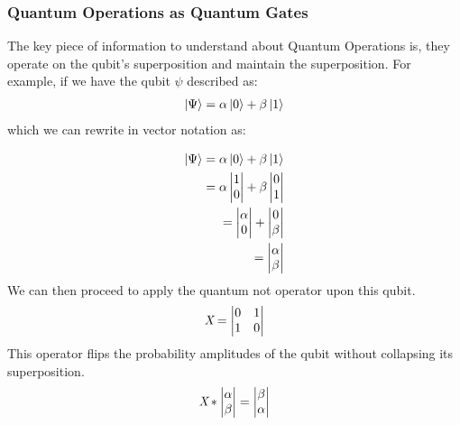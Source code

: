 \documentclass[conference]{IEEEtran}
\begin{document}
\subsubsection{Quantum Operations as Quantum Gates}
The key piece of information to understand about Quantum Operations is, they operate on the qubit's superposition and maintain the superposition. For example, if we have the qubit $\psi$ described as:
\begin{align*}
\ket{\Psi} = \alpha\ket{0} + \beta\ket{1}
\end{align*}
which we can rewrite in vector notation as:

\begin{align*}
\ket{\Psi} = \alpha\ket{0} + \beta\ket{1} \\
 = \alpha \begin{vmatrix}
1\\
0\\
\end{vmatrix} + \beta \begin{vmatrix}
0\\
1\\
\end{vmatrix} \\
=  \begin{vmatrix}
\alpha\\
0\\
\end{vmatrix} +  \begin{vmatrix}
0\\
\beta\\
\end{vmatrix} \\
 =  \begin{vmatrix}
\alpha\\
\beta\\
\end{vmatrix} 
\end{align*}
We can then proceed to apply the quantum not operator upon this qubit. 
\begin{align*}
    \emph{X} = \begin{vmatrix}
    0 & 1 \\
    1 & 0 \\
    \end{vmatrix}
\end{align*}
This operator flips the probability amplitudes of the qubit without collapsing its superposition.
\begin{align*}
    \emph{X} * \begin{vmatrix}
\alpha\\
\beta\\
\end{vmatrix} = \begin{vmatrix}
\beta\\
\alpha\\
\end{vmatrix} 
\end{align*}
\end{document}
